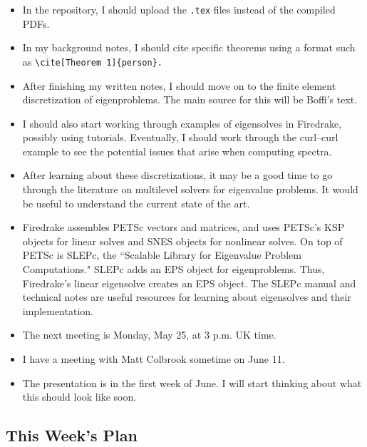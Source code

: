 \documentclass[12pt,a4paper]{article}
\begin{document}
\begin{itemize}
    \item In the repository, I should upload the \texttt{.tex} files instead of the compiled PDFs.

    \item In my background notes, I should cite specific theorems using a format such as \verb|\cite[Theorem 1]{person}.|

    \item After finishing my written notes, I should move on to the finite element discretization of eigenproblems. The main source for this will be Boffi's text.

    \item I should also start working through examples of eigensolves in Firedrake, possibly using tutorials. Eventually, I should work through the curl--curl example to see the potential issues that arise when computing spectra.

    \item After learning about these discretizations, it may be a good time to go through the literature on multilevel solvers for eigenvalue problems. It would be useful to understand the current state of the art.

    \item Firedrake assembles PETSc vectors and matrices, and uses PETSc's KSP objects for linear solves and SNES objects for nonlinear solves. On top of PETSc is SLEPc, the ``Scalable Library for Eigenvalue Problem Computations." SLEPc adds an EPS object for eigenproblems. Thus, Firedrake's linear eigensolve creates an EPS object. The SLEPc manual and technical notes are useful resources for learning about eigensolves and their implementation.

    \item The next meeting is Monday, May 25, at 3 p.m. UK time.

    \item I have a meeting with Matt Colbrook sometime on June 11.

    \item The presentation is in the first week of June. I will start thinking about what this should look like soon.
\end{itemize}


\subsection{This Week's Plan}
\end{document}
